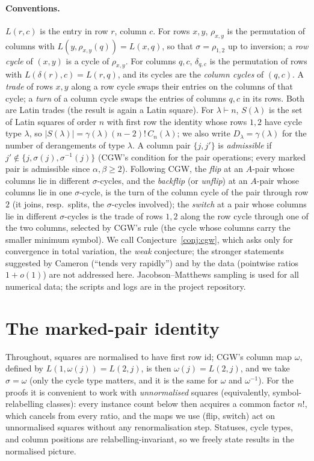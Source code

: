 \documentclass[11pt]{article}
\theoremstyle{definition}
\newcommand{\CC}{C}
\begin{document}
\paragraph{Conventions.}  $L(r,c)$ is the entry in row $r$, column $c$.  For rows $x,y$,
$\rho_{x,y}$ is the permutation of columns with $L(y,\rho_{x,y}(q))=L(x,q)$, so that
$\sigma=\rho_{1,2}$ up to inversion; a \emph{row cycle} of $(x,y)$ is a cycle of
$\rho_{x,y}$.  For columns $q,c$, $\delta_{q,c}$ is the permutation of rows with
$L(\delta(r),c)=L(r,q)$, and its cycles are the \emph{column cycles} of $(q,c)$.  A
\emph{trade} of rows $x,y$ along a row cycle swaps their entries on the columns of that
cycle; a \emph{turn} of a column cycle swaps the entries of columns $q,c$ in its rows.  Both
are Latin trades (the result is again a Latin square).  For $\lambda\vdash n$, $S(\lambda)$ is
the set of Latin squares of order $n$ with first row the identity whose rows $1,2$ have
cycle type $\lambda$, so $|S(\lambda)|=\gamma(\lambda)(n-2)!\,\CC_n(\lambda)$; we also
write $D_\lambda=\gamma(\lambda)$ for the number of derangements of type $\lambda$.  A
column pair $\{j,j'\}$ is \emph{admissible} if $j'\notin\{j,\sigma(j),\sigma^{-1}(j)\}$
(CGW's condition for the pair operations; every marked pair is admissible since
$\alpha,\beta\ge2$).  Following CGW, the \emph{flip} at an $A$-pair whose columns lie in
different $\sigma$-cycles, and the \emph{backflip} (or \emph{unflip}) at an $A$-pair whose
columns lie in one $\sigma$-cycle, is the turn of the column cycle of the pair through row
$2$ (it joins, resp.\ splits, the $\sigma$-cycles involved); the \emph{switch} at a pair
whose columns lie in different $\sigma$-cycles is the trade of rows $1,2$ along the row
cycle through one of the two columns, selected by CGW's rule (the cycle whose columns
carry the smaller minimum symbol).  We call Conjecture~\ref{conj:cgw}, which asks only
for convergence in total variation, the \emph{weak} conjecture; the stronger statements
suggested by Cameron (``tends very rapidly'') and by the data (pointwise ratios
$1+o(1)$) are not addressed here.
Jacobson--Matthews sampling
\cite{JM96} is used for all numerical data; the scripts and logs are in the project
repository.

\section{The marked-pair identity}\label{sec:marked}

Throughout, squares are normalised to have first row $\mathrm{id}$; CGW's column map
$\omega$, defined by $L(1,\omega(j))=L(2,j)$, is then $\omega(j)=L(2,j)$, and we take
$\sigma=\omega$ (only the cycle type matters, and it is the same for $\omega$ and $\omega^{-1}$).  For the proofs it
is convenient to work with \emph{unnormalised} squares (equivalently,
symbol-relabelling classes): every instance count below then acquires a
common factor $n!$, which cancels from every ratio, and the maps we use
(flip, switch) act on unnormalised squares without any renormalisation
step.  Statuses, cycle types, and column positions are
relabelling-invariant, so we freely state results in the normalised
picture.
\end{document}
